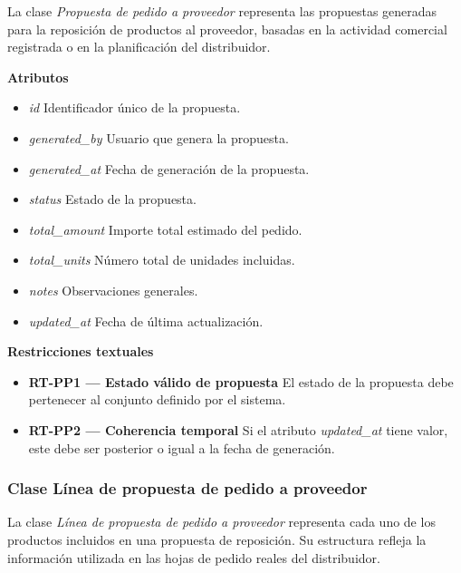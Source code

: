 La clase \textit{Propuesta de pedido a proveedor} representa las propuestas generadas para la reposición de productos al proveedor, basadas en la actividad comercial registrada o en la planificación del distribuidor.

\textbf{Atributos}

\begin{itemize}

      \item \textit{id}
            Identificador único de la propuesta.
      \item \textit{generated\_by}
            Usuario que genera la propuesta.
      \item \textit{generated\_at}
            Fecha de generación de la propuesta.
      \item \textit{status}
            Estado de la propuesta.
      \item \textit{total\_amount}
            Importe total estimado del pedido.
      \item \textit{total\_units}
            Número total de unidades incluidas.
      \item \textit{notes}
            Observaciones generales.
      \item \textit{updated\_at}
            Fecha de última actualización.

\end{itemize}

\textbf{Restricciones textuales}

\begin{itemize}

      \item \textbf{RT-PP1 — Estado válido de propuesta}
            El estado de la propuesta debe pertenecer al conjunto definido por el sistema.
      \item \textbf{RT-PP2 — Coherencia temporal}
            Si el atributo \textit{updated\_at} tiene valor, este debe ser posterior o igual a la fecha de generación.

\end{itemize}

\subsubsection{Clase Línea de propuesta de pedido a proveedor}

La clase \textit{Línea de propuesta de pedido a proveedor} representa cada uno de los productos incluidos en una propuesta de reposición. Su estructura refleja la información utilizada en las hojas de pedido reales del distribuidor.

